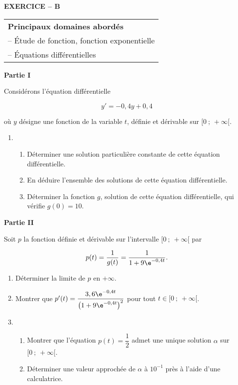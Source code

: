 \textbf{EXERCICE -- B}

\medskip

\begin{tabular}{|l|}\hline
\textbf{Principaux domaines abordés}\\
-- Étude de fonction, fonction exponentielle\\
-- Équations différentielles\\ \hline
\end{tabular}

\bigskip

\textbf{Partie I}

\medskip

Considérons l'équation différentielle

\[y'= -0,4y + 0,4\]

où $y$ désigne une fonction de la variable $t$, définie et dérivable sur $[0~;~ + \infty[$.

\medskip

\begin{enumerate}
\item 
	\begin{enumerate}
		\item Déterminer une solution particulière constante de cette équation différentielle. 
		\item En déduire l'ensemble des solutions de cette équation différentielle.
\item Déterminer la fonction $g$, solution de cette équation différentielle, qui vérifie $g(0) = 10$.
	\end{enumerate}
\end{enumerate}

\bigskip

\textbf{Partie II}

\medskip

Soit $p$ la fonction définie et dérivable sur l'intervalle $[0~;~+ \infty[$ par 

\[p(t) = \dfrac{1}{g(t)} = \dfrac{1}{1 + 9\e^{-0,4t}}.\]

\smallskip

\begin{enumerate}
\item Déterminer la limite de $p$ en $+ \infty$. 
\item Montrer que $p'(t) = \dfrac{3,6\e^{-0,4t}}{ \left(1 + 9\e^{-0,4t}\right)^2}$ pour tout $t \in  [0~;~+ \infty[$.

\item  
	\begin{enumerate}
		\item Montrer que l'équation $p(t) = \dfrac{1}{2}$ admet une unique solution $\alpha$ sur $[0~;~+ \infty[$. 
		\item Déterminer une valeur approchée de $\alpha$ à $10^{-1}$ près à l'aide d'une calculatrice.
	\end{enumerate}
\end{enumerate}

